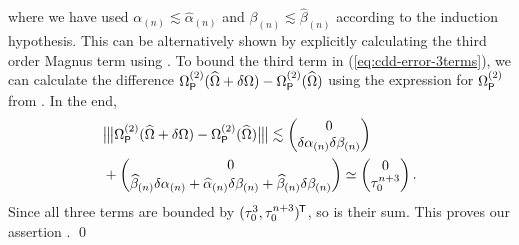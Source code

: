 \documentclass[aps,pra,reprint,superscriptaddress]{revtex4-2}
\newcommand{\Opdd}{\Omega_{\mathsf{P}}}
\begin{document}
where we have used $\alpha_{(n)}\lesssim\widehat\alpha_{(n)}$ and $\beta_{(n)}\lesssim\widehat\beta_{(n)}$ according to the induction hypothesis.
This can be alternatively shown by explicitly calculating the third order Magnus term using . 
To bound the third term in (\ref{eq:cdd-error-3terms}), we can calculate the difference $\Opdd\up{2}(\Ohat+\delta\Omega) - \Opdd\up{2}(\Ohat)$
using the expression for $\Opdd\up{2}$ from .  In the end,
\begin{equation*}
\begin{split}
&\opnorm[\big]{\Opdd\up{2}(\Ohat+\delta\Omega) - \Opdd\up{2}(\Ohat)} 
\lesssim\begin{pmatrix}
    0\\
    \delta\alpha_{(n)}\delta\beta_{(n)}
\end{pmatrix}\\
&+\begin{pmatrix}
    0\\
    \widehat\beta_{(n)}\delta\alpha_{(n)} + \widehat\alpha_{(n)} \delta\beta_{(n)}
    +\widehat\beta_{(n)} \delta\beta_{(n)} 
\end{pmatrix}\simeq
\begin{pmatrix}
    0\\
    \Dt^{n+3}
\end{pmatrix}.
\end{split}
\end{equation*}
Since all three terms are bounded by $(\tau_0^3, \tau_0^{n+3})^{\mkern-1.5mu\mathsf{T}}$, so is their sum. This proves our assertion . \qed

\smallskip
\end{document}
